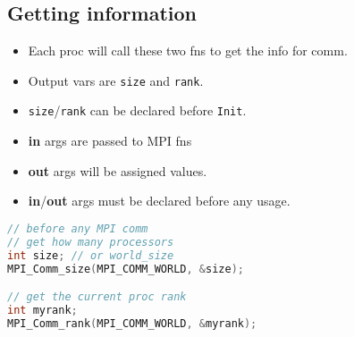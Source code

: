 \subsection*{Getting information}
\begin{minipage}{0.5\linewidth}
  \flushleft
  \begin{itemize}
  \item Each proc will call these two fns to get the info for comm.
  \item Output vars are \texttt{size} and \texttt{rank}.
  \item \texttt{size}/\texttt{rank} can be declared before \texttt{Init}.
  \item \textbf{in} args are passed to MPI fns
  \item \textbf{out} args will be assigned values.
  \item \textbf{in}/\textbf{out} args must be declared before any usage.
  \end{itemize}
\end{minipage}
\begin{minipage}{0.48\linewidth}
\begin{lstlisting}[language=c,xleftmargin=1pt]
// before any MPI comm
// get how many processors
int size; // or world_size
MPI_Comm_size(MPI_COMM_WORLD, &size);

// get the current proc rank
int myrank;
MPI_Comm_rank(MPI_COMM_WORLD, &myrank);
\end{lstlisting}
\end{minipage}

